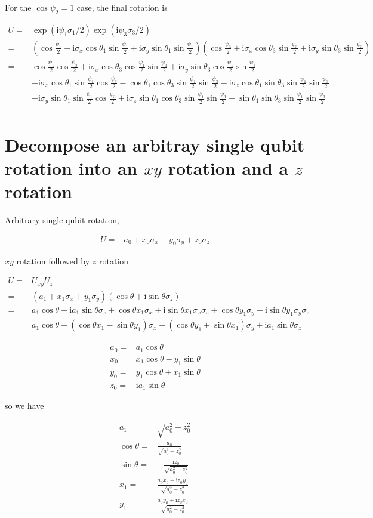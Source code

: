 \documentclass[10pt,fleqn]{article}
\newcommand{\ui}{\mathrm{i}}
\newcommand{\eqar}[1]
{
  \begin{align*}
    #1
  \end{align*}
}
\newcommand{\paren}[1]{{\left({#1}\right)}}
\begin{document}
For the $\cos\psi_2=1$ case, the final rotation is
\eqar{
  U=&\exp\paren{\ui\psi_1\sigma_1/2}\exp\paren{\ui\psi_3\sigma_3/2}\\
  =&\paren{\cos\frac{\psi_1}{2}+\ui\sigma_x\cos\theta_1\sin\frac{\psi_1}{2}+\ui\sigma_y\sin\theta_1\sin\frac{\psi_1}{2}}\paren{\cos\frac{\psi_3}{2}+\ui\sigma_x\cos\theta_3\sin\frac{\psi_3}{2}+\ui\sigma_y\sin\theta_3\sin\frac{\psi_3}{2}}\\
  =&\cos\frac{\psi_1}{2}\cos\frac{\psi_3}{2}+\ui\sigma_x\cos\theta_3\cos\frac{\psi_1}{2}\sin\frac{\psi_3}{2}+\ui\sigma_y\sin\theta_3\cos\frac{\psi_1}{2}\sin\frac{\psi_3}{2}\\
  &+\ui\sigma_x\cos\theta_1\sin\frac{\psi_1}{2}\cos\frac{\psi_3}{2}-\cos\theta_1\cos\theta_3\sin\frac{\psi_1}{2}\sin\frac{\psi_3}{2}-\ui\sigma_z\cos\theta_1\sin\theta_3\sin\frac{\psi_1}{2}\sin\frac{\psi_3}{2}\\
  &+\ui\sigma_y\sin\theta_1\sin\frac{\psi_1}{2}\cos\frac{\psi_3}{2}+\ui\sigma_z\sin\theta_1\cos\theta_3\sin\frac{\psi_1}{2}\sin\frac{\psi_3}{2}-\sin\theta_1\sin\theta_3\sin\frac{\psi_1}{2}\sin\frac{\psi_3}{2}\\
}

\clearpage
\appendix
\section{Decompose an arbitray single qubit rotation into an $xy$ rotation
  and a $z$ rotation}

Arbitrary single qubit rotation,
\eqar{
  U=&a_0 + x_0 \sigma_x + y_0 \sigma_y + z_0 \sigma_z
}
$xy$ rotation followed by $z$ rotation
\eqar{
  U=&U_{xy} U_z\\
  =&\paren{a_1 + x_1 \sigma_x + y_1 \sigma_y}\paren{\cos\theta + \ui\sin\theta\sigma_z}\\
  =&a_1\cos\theta + \ui a_1\sin\theta \sigma_z + \cos\theta x_1 \sigma_x + \ui\sin\theta x_1 \sigma_x\sigma_z + \cos\theta y_1 \sigma_y + \ui\sin\theta y_1 \sigma_y\sigma_z\\
  =&a_1\cos\theta + \paren{\cos\theta x_1 - \sin\theta y_1} \sigma_x + \paren{\cos\theta y_1 + \sin\theta x_1} \sigma_y + \ui a_1\sin\theta \sigma_z
}
\eqar{
  a_0=&a_1\cos\theta\\
  x_0=&x_1\cos\theta - y_1\sin\theta\\
  y_0=&y_1\cos\theta + x_1\sin\theta\\
  z_0=&\ui a_1\sin\theta
}
so we have
\eqar{
  a_1=&\sqrt{a_0^2-z_0^2}\\
  \cos\theta=&\frac{a_0}{\sqrt{a_0^2-z_0^2}}\\
  \sin\theta=&-\frac{\ui z_0}{\sqrt{a_0^2-z_0^2}}\\
  x_1=&\frac{a_0x_0-\ui z_0y_0}{\sqrt{a_0^2-z_0^2}}\\
  y_1=&\frac{a_0y_0+\ui z_0x_0}{\sqrt{a_0^2-z_0^2}}
}
\end{document}

